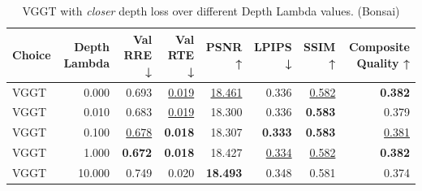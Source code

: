 \begin{table}[H]
\caption{\ifdefined\customcaption \customcaption \else VGGT with \textit{closer} depth loss over different Depth Lambda values. (Bonsai) \fi}
\label{tab:05_depth_lambda_bonsai}
\centering
\scriptsize
\begin{tabular}{lrrrrrrr}
\toprule
Choice & Depth Lambda & Val RRE ↓ & Val RTE ↓ & PSNR ↑ & LPIPS ↓ & SSIM ↑ & Composite Quality ↑ \\
\midrule
VGGT & 0.000 & 0.693 & \underline{0.019} & \underline{18.461} & 0.336 & \underline{0.582} & \textbf{0.382} \\
VGGT & 0.010 & 0.683 & \underline{0.019} & 18.300 & 0.336 & \textbf{0.583} & 0.379 \\
VGGT & 0.100 & \underline{0.678} & \textbf{0.018} & 18.307 & \textbf{0.333} & \textbf{0.583} & \underline{0.381} \\
VGGT & 1.000 & \textbf{0.672} & \textbf{0.018} & 18.427 & \underline{0.334} & \underline{0.582} & \textbf{0.382} \\
VGGT & 10.000 & 0.749 & 0.020 & \textbf{18.493} & 0.348 & 0.581 & 0.374 \\
\bottomrule
\end{tabular}
\end{table}